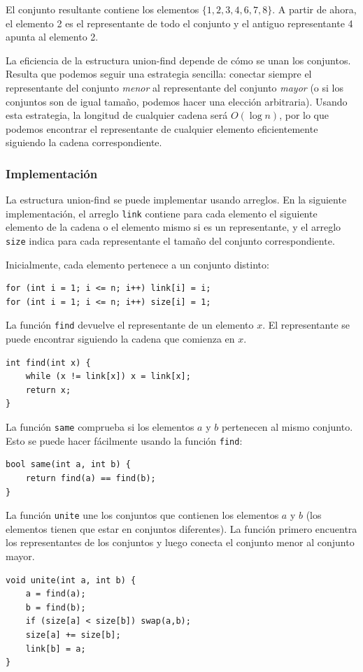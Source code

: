 El conjunto resultante contiene los elementos
$\{1,2,3,4,6,7,8\}$.
A partir de ahora, el elemento 2 es el representante
de todo el conjunto y el antiguo representante 4
apunta al elemento 2.

La eficiencia de la estructura union-find depende de
cómo se unan los conjuntos.
Resulta que podemos seguir una estrategia sencilla:
conectar siempre el representante del
conjunto \emph{menor} al representante del conjunto \emph{mayor}
(o si los conjuntos son de igual tamaño,
podemos hacer una elección arbitraria).
Usando esta estrategia, la longitud de cualquier cadena
será $O(\log n)$, por lo que podemos
encontrar el representante de cualquier elemento
eficientemente siguiendo la cadena correspondiente.

\subsubsection{Implementación}

La estructura union-find se puede implementar
usando arreglos.
En la siguiente implementación,
el arreglo \texttt{link} contiene para cada elemento
el siguiente elemento
de la cadena o el elemento mismo si es
un representante,
y el arreglo \texttt{size} indica para cada representante
el tamaño del conjunto correspondiente.

Inicialmente, cada elemento pertenece a un conjunto distinto:
\begin{lstlisting}
for (int i = 1; i <= n; i++) link[i] = i;
for (int i = 1; i <= n; i++) size[i] = 1;
\end{lstlisting}

La función \texttt{find} devuelve
el representante de un elemento $x$.
El representante se puede encontrar siguiendo
la cadena que comienza en $x$.

\begin{lstlisting}
int find(int x) {
    while (x != link[x]) x = link[x];
    return x;
}
\end{lstlisting}

La función \texttt{same} comprueba
si los elementos $a$ y $b$ pertenecen al mismo conjunto.
Esto se puede hacer fácilmente usando la
función \texttt{find}:

\begin{lstlisting}
bool same(int a, int b) {
    return find(a) == find(b);
}
\end{lstlisting}

\begin{samepage}
La función \texttt{unite} une los conjuntos
que contienen los elementos $a$ y $b$
(los elementos tienen que estar en conjuntos diferentes).
La función primero encuentra los representantes
de los conjuntos y luego conecta el conjunto
menor al conjunto mayor.

\begin{lstlisting}
void unite(int a, int b) {
    a = find(a);
    b = find(b);
    if (size[a] < size[b]) swap(a,b);
    size[a] += size[b];
    link[b] = a;
}
\end{lstlisting}
\end{samepage}

